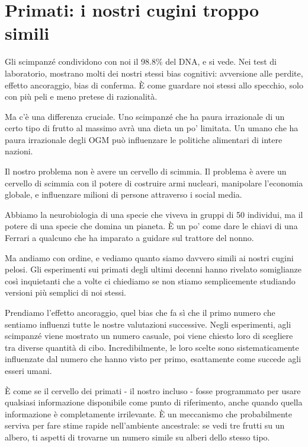 \chapter{Primati: i nostri cugini troppo simili}

Gli scimpanzé condividono con noi il 98.8\% del DNA, e si vede. Nei test di laboratorio, mostrano molti dei nostri stessi bias cognitivi: avversione alle perdite, effetto ancoraggio, bias di conferma. È come guardare noi stessi allo specchio, solo con più peli e meno pretese di razionalità.

Ma c'è una differenza cruciale. Uno scimpanzé che ha paura irrazionale di un certo tipo di frutto al massimo avrà una dieta un po' limitata. Un umano che ha paura irrazionale degli OGM può influenzare le politiche alimentari di intere nazioni.

Il nostro problema non è avere un cervello di scimmia. Il problema è avere un cervello di scimmia con il potere di costruire armi nucleari, manipolare l'economia globale, e influenzare milioni di persone attraverso i social media.

Abbiamo la neurobiologia di una specie che viveva in gruppi di 50 individui, ma il potere di una specie che domina un pianeta. È un po' come dare le chiavi di una Ferrari a qualcuno che ha imparato a guidare sul trattore del nonno.

\bigskip

Ma andiamo con ordine, e vediamo quanto siamo davvero simili ai nostri cugini pelosi. Gli esperimenti sui primati degli ultimi decenni hanno rivelato somiglianze così inquietanti che a volte ci chiediamo se non stiamo semplicemente studiando versioni più semplici di noi stessi.

Prendiamo l'effetto ancoraggio, quel bias che fa sì che il primo numero che sentiamo influenzi tutte le nostre valutazioni successive. Negli esperimenti, agli scimpanzé viene mostrato un numero casuale, poi viene chiesto loro di scegliere tra diverse quantità di cibo. Incredibilmente, le loro scelte sono sistematicamente influenzate dal numero che hanno visto per primo, esattamente come succede agli esseri umani.

È come se il cervello dei primati - il nostro incluso - fosse programmato per usare qualsiasi informazione disponibile come punto di riferimento, anche quando quella informazione è completamente irrilevante. È un meccanismo che probabilmente serviva per fare stime rapide nell'ambiente ancestrale: se vedi tre frutti su un albero, ti aspetti di trovarne un numero simile su alberi dello stesso tipo.

